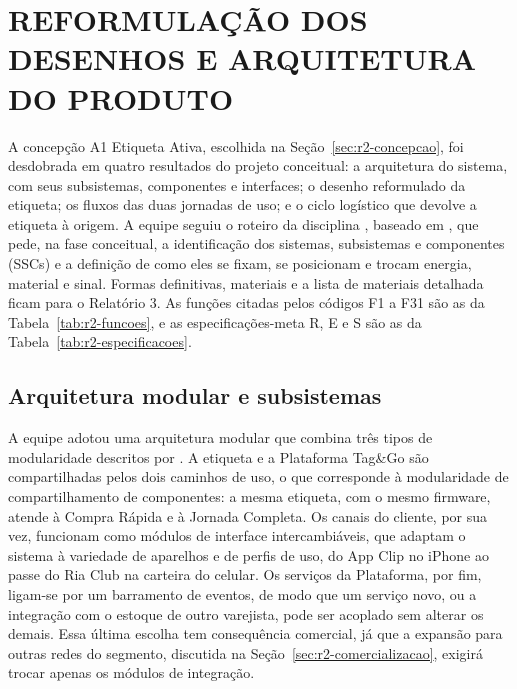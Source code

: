 
\section{REFORMULAÇÃO DOS DESENHOS E ARQUITETURA DO PRODUTO}
\label{sec:r2-arquitetura}

A concepção A1 Etiqueta Ativa, escolhida na Seção~\ref{sec:r2-concepcao}, foi desdobrada em quatro resultados do projeto conceitual: a arquitetura do sistema, com seus subsistemas, componentes e interfaces; o desenho reformulado da etiqueta; os fluxos das duas jornadas de uso; e o ciclo logístico que devolve a etiqueta à origem. A equipe seguiu o roteiro da disciplina \cite{zancul2026conceitual}, baseado em , que pede, na fase conceitual, a identificação dos sistemas, subsistemas e componentes (SSCs) e a definição de como eles se fixam, se posicionam e trocam energia, material e sinal. Formas definitivas, materiais e a lista de materiais detalhada ficam para o Relatório 3. As funções citadas pelos códigos F1 a F31 são as da Tabela~\ref{tab:r2-funcoes}, e as especificações-meta R, E e S são as da Tabela~\ref{tab:r2-especificacoes}.

\subsection{Arquitetura modular e subsistemas}

A equipe adotou uma arquitetura modular que combina três tipos de modularidade descritos por . A etiqueta e a Plataforma Tag\&Go são compartilhadas pelos dois caminhos de uso, o que corresponde à modularidade de compartilhamento de componentes: a mesma etiqueta, com o mesmo firmware, atende à Compra Rápida e à Jornada Completa. Os canais do cliente, por sua vez, funcionam como módulos de interface intercambiáveis, que adaptam o sistema à variedade de aparelhos e de perfis de uso, do App Clip no iPhone ao passe do Ria Club na carteira do celular. Os serviços da Plataforma, por fim, ligam-se por um barramento de eventos, de modo que um serviço novo, ou a integração com o estoque de outro varejista, pode ser acoplado sem alterar os demais. Essa última escolha tem consequência comercial, já que a expansão para outras redes do segmento, discutida na Seção~\ref{sec:r2-comercializacao}, exigirá trocar apenas os módulos de integração.

